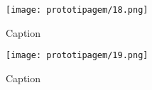 \documentclass[
	article,			%
	12pt,				%
	oneside,			%
	a4paper,			%
	english,			%
	brazil,				%
	sumario=tradicional
	]{abntex2}
\begin{document}
\begin{apendicesenv}
\begin{figure}
    \centering
    \texttt{[image: prototipagem/18.png]}
    \caption{Caption}
    \label{fig:enter-label}
\end{figure}

\begin{figure}
    \centering
    \texttt{[image: prototipagem/19.png]}
    \caption{Caption}
    \label{fig:enter-label}
\end{figure}



\end{apendicesenv}

\newpage
\end{document}

